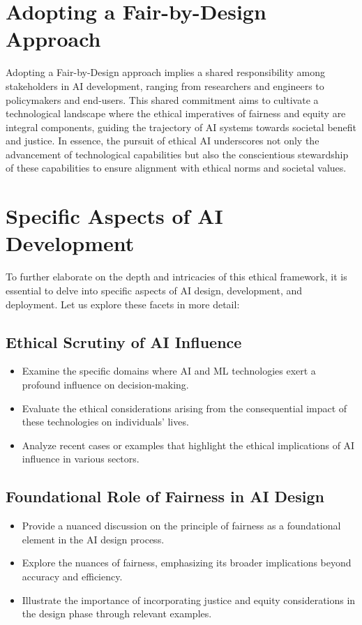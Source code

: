 \section{Adopting a Fair-by-Design Approach}

Adopting a Fair-by-Design approach implies a shared responsibility among stakeholders in AI development, ranging from researchers and engineers to policymakers and end-users. This shared commitment aims to cultivate a technological landscape where the ethical imperatives of fairness and equity are integral components, guiding the trajectory of AI systems towards societal benefit and justice. In essence, the pursuit of ethical AI underscores not only the advancement of technological capabilities but also the conscientious stewardship of these capabilities to ensure alignment with ethical norms and societal values.

\section{Specific Aspects of AI Development}

To further elaborate on the depth and intricacies of this ethical framework, it is essential to delve into specific aspects of AI design, development, and deployment. Let us explore these facets in more detail:

\subsection{Ethical Scrutiny of AI Influence}

\begin{itemize}[label=--]
    \item Examine the specific domains where AI and ML technologies exert a profound influence on decision-making.
    \item Evaluate the ethical considerations arising from the consequential impact of these technologies on individuals' lives.
    \item Analyze recent cases or examples that highlight the ethical implications of AI influence in various sectors.
\end{itemize}

\subsection*{Foundational Role of Fairness in AI Design}

\begin{itemize}[label=--]
    \item Provide a nuanced discussion on the principle of fairness as a foundational element in the AI design process.
    \item Explore the nuances of fairness, emphasizing its broader implications beyond accuracy and efficiency.
    \item Illustrate the importance of incorporating justice and equity considerations in the design phase through relevant examples.
\end{itemize}

